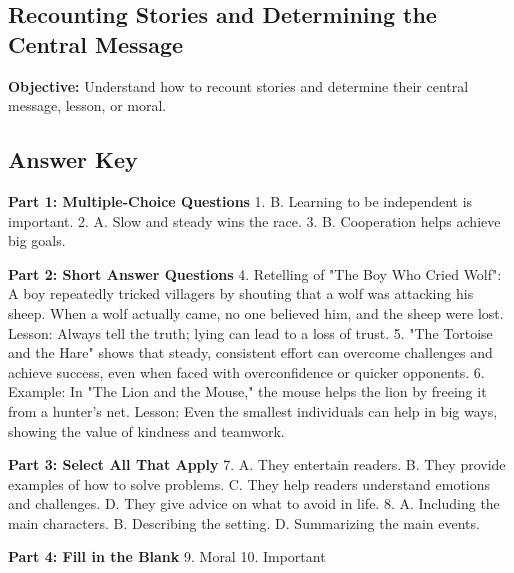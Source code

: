 \documentclass[12pt]{article}
\begin{document}
\subsection*{Recounting Stories and Determining the Central Message}
\onehalfspacing

\begin{tcolorbox}[colframe=black!40, colback=gray!0, title=Learning Objective]
\textbf{Objective:} Understand how to recount stories and determine their central message, lesson, or moral.
\end{tcolorbox}


\subsection*{Answer Key}

\textbf{Part 1: Multiple-Choice Questions}  
1. B. Learning to be independent is important.  
2. A. Slow and steady wins the race.  
3. B. Cooperation helps achieve big goals.  

\textbf{Part 2: Short Answer Questions}  
4. Retelling of "The Boy Who Cried Wolf": A boy repeatedly tricked villagers by shouting that a wolf was attacking his sheep. When a wolf actually came, no one believed him, and the sheep were lost. Lesson: Always tell the truth; lying can lead to a loss of trust.  
5. "The Tortoise and the Hare" shows that steady, consistent effort can overcome challenges and achieve success, even when faced with overconfidence or quicker opponents.  
6. Example: In "The Lion and the Mouse," the mouse helps the lion by freeing it from a hunter's net. Lesson: Even the smallest individuals can help in big ways, showing the value of kindness and teamwork.  

\textbf{Part 3: Select All That Apply}  
7. A. They entertain readers.  
   B. They provide examples of how to solve problems.  
   C. They help readers understand emotions and challenges.  
   D. They give advice on what to avoid in life.  
8. A. Including the main characters.  
   B. Describing the setting.  
   D. Summarizing the main events.  

\textbf{Part 4: Fill in the Blank}  
9. Moral  
10. Important  
\end{document}
